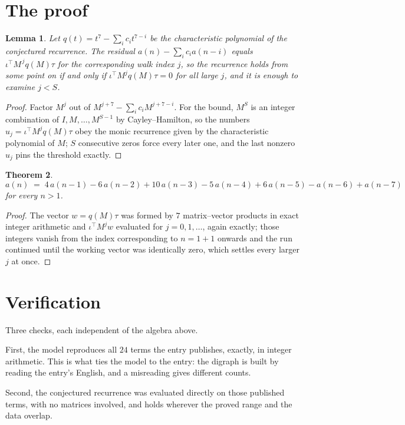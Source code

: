 \documentclass[11pt,a4paper]{article}
\theoremstyle{plain}
\newtheorem{theorem}{Theorem}
\newtheorem{lemma}[theorem]{Lemma}
\theoremstyle{definition}
\begin{document}
\section{The proof}

\begin{lemma}\label{lem:crit}
Let $q(t)=t^{7}-\sum_i c_it^{7-i}$ be the characteristic polynomial of the
conjectured recurrence. The residual $a(n)-\sum_ic_ia(n-i)$ equals
$\iota^{\!\top}M^{\,j}q(M)\tau$ for the corresponding walk index $j$, so the recurrence
holds from some point on if and only if $\iota^{\!\top}M^{j}q(M)\tau=0$ for all large $j$,
and it is enough to examine $j<S$.
\end{lemma}

\begin{proof}
Factor $M^{j}$ out of $M^{j+7}-\sum_ic_iM^{j+7-i}$. For the bound, $M^{S}$
is an integer combination of $I,M,\dots,M^{S-1}$ by Cayley--Hamilton, so the numbers
$u_j=\iota^{\!\top}M^{j}q(M)\tau$ obey the monic recurrence given by the characteristic
polynomial of $M$; $S$ consecutive zeros force every later one, and the last nonzero $u_j$
pins the threshold exactly.
\end{proof}

\begin{theorem}
\[
a(n)\;=\;4\,a(n-1) - 6\,a(n-2) + 10\,a(n-3) - 5\,a(n-4) + 6\,a(n-5) - a(n-6) + a(n-7)
\]
for every $n>1$.
\end{theorem}

\begin{proof}
The vector $w=q(M)\tau$ was formed by $7$ matrix--vector products in exact integer
arithmetic and $\iota^{\!\top}M^{j}w$ evaluated for $j=0,1,\dots$, again exactly; those
integers vanish from the index corresponding to $n=1+1$ onwards and the run continued
until the working vector was identically zero, which settles every larger $j$ at once.
\end{proof}

\section{Verification}

Three checks, each independent of the algebra above.

First, the model reproduces all $24$ terms the entry publishes, exactly, in integer
arithmetic. This is what ties the model to the entry: the digraph is built by reading the
entry's English, and a misreading gives different counts.

Second, the conjectured recurrence was evaluated directly on those published terms, with no
matrices involved, and holds wherever the proved range and the data overlap.
\end{document}
